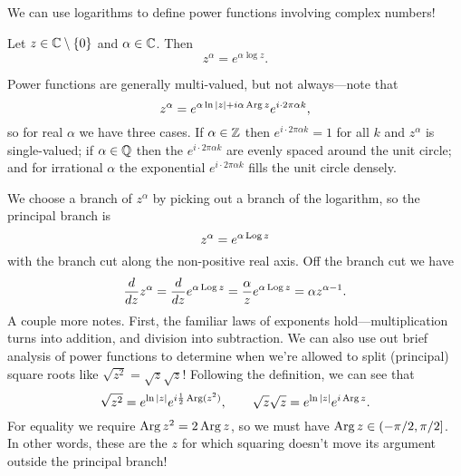 \documentclass[../m136main.tex]{subfiles}
\begin{document}
We can use logarithms to define power functions involving complex numbers!

\begin{definition}
    Let $z \in \mathbb{C} \setminus \left\{ 0 \right\}$ and $\alpha \in \mathbb{C}$.
    Then
    \[ z^{\alpha} = e^{\alpha \log z}. \]
\end{definition}

Power functions are generally multi-valued, but not always---note that
\[ z^{\alpha} = e^{\alpha \ln |z| + i\alpha \operatorname{Arg} z} e^{i \cdot 2\pi \alpha k}, \]
so for real $\alpha$ we have three cases.
If $\alpha \in \mathbb{Z}$ then $e^{i \cdot 2\pi \alpha k} = 1$ for all $k$ and $z^{\alpha}$ is single-valued; if $\alpha \in \mathbb{Q}$ then the $e^{i \cdot 2\pi \alpha k}$ are evenly spaced around the unit circle; and for irrational $\alpha$ the exponential $e^{i \cdot 2\pi \alpha k}$ fills the unit circle densely.

We choose a branch of $z^{\alpha}$ by picking out a branch of the logarithm, so the principal branch is
\[ z^{\alpha} = e^{\alpha \operatorname{Log} z} \]
with the branch cut along the non-positive real axis.
Off the branch cut we have
\[ \frac{d}{dz} z^{\alpha} = \frac{d}{dz} e^{\alpha \operatorname{Log} z} = \frac{\alpha}{z} e^{\alpha \operatorname{Log} z} = \alpha z^{\alpha - 1}. \]
A couple more notes.
First, the familiar laws of exponents hold---multiplication turns into addition, and division into subtraction.
We can also use out brief analysis of power functions to determine when we're allowed to split (principal) square roots like $\sqrt{z^2} = \sqrt{z} \sqrt{z}$!
Following the definition, we can see that
\[ \sqrt{z^2} = e^{\ln |z|} e^{i \frac{1}{2} \operatorname{Arg} (z^2)}, \qquad \sqrt{z} \sqrt{z} = e^{\ln |z|} e^{i \operatorname{Arg} z}. \]
For equality we require $\operatorname{Arg} z^2 = 2 \operatorname{Arg} z$, so we must have $\operatorname{Arg} z \in (-\pi / 2, \pi / 2]$.
In other words, these are the $z$ for which squaring doesn't move its argument outside the principal branch!
\end{document}
